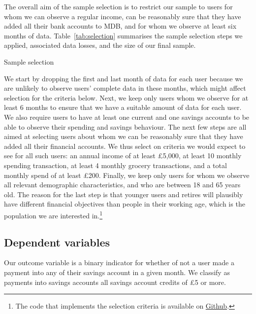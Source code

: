 The overall aim of the sample selection is to restrict our sample to users for
whom we can observe a regular income, can be reasonably sure that they have
added all their bank accounts to MDB, and for whom we observe at least six
months of data. Table~\ref{tab:selection} summarises the sample selection steps
we applied, associated data losses, and the size of our final sample.

\begin{table}[ht]
\centering\footnotesize
\caption{Sample selection}\label{tab:selection}

\end{table}

We start by dropping the first and last month of data for each user because we
are unlikely to observe users' complete data in these months, which might
affect selection for the criteria below. Next, we keep only users whom we
observe for at least 6 months to ensure that we have a suitable amount of data
for each user. We also require users to have at least one current and one
savings accounts to be able to observe their spending and savings behaviour. The
next few steps are all aimed at selecting users about whom we can be reasonably
sure that they have added all their financial accounts. We thus select on
criteria we would expect to see for all such users: an annual income of at
least \pounds5,000, at least 10 monthly spending transaction, at least 4
monthly grocery transactions, and a total monthly spend of at least \pounds200.
Finally, we keep only users for whom we observe all relevant demographic
characteristics, and who are between 18 and 65 years old. The reason for the
last step is that younger users and retires will plausibly have different
financial objectives than people in their working age, which is the population
we are interested in.\footnote{The code that implements the selection
criteria is available on
\href{https://github.com/fabiangunzinger/entropy/blob/c49c9c34c96d073725afd3a1494458a388d00051/src/data/selectors.py}{Github}.}


\subsection{Dependent variables}
\label{sub:dependent_variables}

Our outcome variable is a binary indicator for whether of not a user made a
payment into any of their savings account in a given month. We classify as
payments into savings accounts all savings account credits of \pounds5 or
more.

